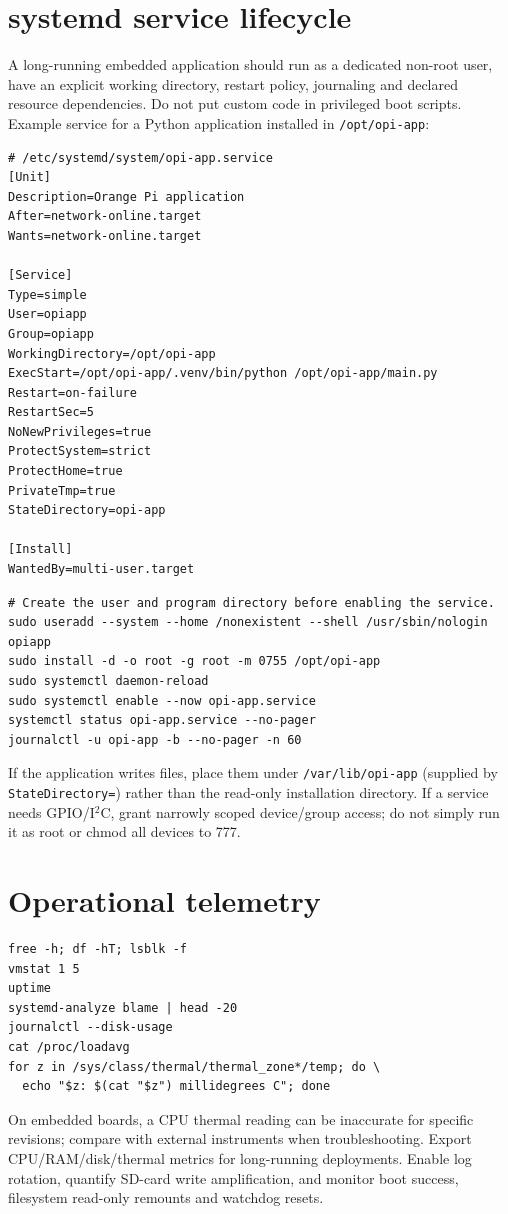 \documentclass[10pt,oneside,openany]{report}
\newcommand{\code}[1]{\texttt{#1}}
\begin{document}
\section{systemd service lifecycle}
A long-running embedded application should run as a dedicated non-root user, have an explicit working directory, restart policy, journaling and declared resource dependencies. Do not put custom code in privileged boot scripts. Example service for a Python application installed in \code{/opt/opi-app}:
\begin{lstlisting}[style=config]
# /etc/systemd/system/opi-app.service
[Unit]
Description=Orange Pi application
After=network-online.target
Wants=network-online.target

[Service]
Type=simple
User=opiapp
Group=opiapp
WorkingDirectory=/opt/opi-app
ExecStart=/opt/opi-app/.venv/bin/python /opt/opi-app/main.py
Restart=on-failure
RestartSec=5
NoNewPrivileges=true
ProtectSystem=strict
ProtectHome=true
PrivateTmp=true
StateDirectory=opi-app

[Install]
WantedBy=multi-user.target
\end{lstlisting}
\begin{lstlisting}[style=sh]
# Create the user and program directory before enabling the service.
sudo useradd --system --home /nonexistent --shell /usr/sbin/nologin opiapp
sudo install -d -o root -g root -m 0755 /opt/opi-app
sudo systemctl daemon-reload
sudo systemctl enable --now opi-app.service
systemctl status opi-app.service --no-pager
journalctl -u opi-app -b --no-pager -n 60
\end{lstlisting}
If the application writes files, place them under \code{/var/lib/opi-app} (supplied by \code{StateDirectory=}) rather than the read-only installation directory. If a service needs GPIO/I\(^{2}\)C, grant narrowly scoped device/group access; do not simply run it as root or chmod all devices to 777.
\section{Operational telemetry}
\begin{lstlisting}[style=sh]
free -h; df -hT; lsblk -f
vmstat 1 5
uptime
systemd-analyze blame | head -20
journalctl --disk-usage
cat /proc/loadavg
for z in /sys/class/thermal/thermal_zone*/temp; do \
  echo "$z: $(cat "$z") millidegrees C"; done
\end{lstlisting}
On embedded boards, a CPU thermal reading can be inaccurate for specific revisions; compare with external instruments when troubleshooting. Export CPU/RAM/disk/thermal metrics for long-running deployments. Enable log rotation, quantify SD-card write amplification, and monitor boot success, filesystem read-only remounts and watchdog resets.
\end{document}

